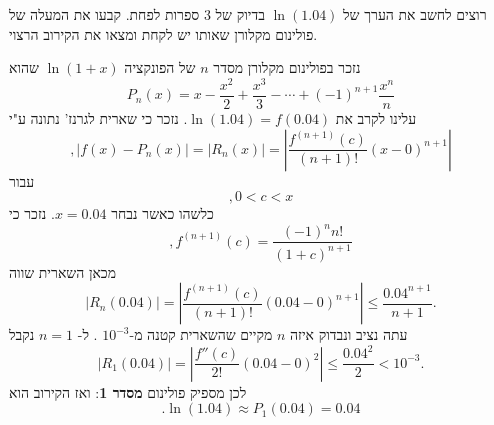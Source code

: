 רוצים לחשב את הערך של
\(\ln (1.04)\) בדיוק של 3 ספרות לפחת. קבעו את המעלה של פולינום מקלורן שאותו יש לקחת
ומצאו את הקירוב הרצוי.
\begin{solbox}
נזכר בפולינום מקלורן מסדר
$n$
של הפונקציה
$\ln(1+x)$
שהוא
\[
P_n(x)= x-\frac{x^2}{2}+\frac{x^3}{3}-\cdots+(-1)^{n+1}\frac{x^n}{n}
\]
עלינו לקרב את
$\ln(1.04)=f(0.04)$.
נזכר כי שארית לגרנז' נתונה ע"י
$$,|f(x)-P_n(x)|=|R_n(x)|=\left|\frac{f^{(n+1)}(c)}{(n+1)!}(x-0)^{n+1}\right|$$
עבור
$$,0<c<x$$
כלשהו כאשר נבחר
$x=0.04$.
נזכר כי
$$,f^{(n+1)}(c)=\frac{(-1)^nn!}{(1+c)^{n+1}}$$
מכאן
השארית שווה
\[
|R_n(0.04)|=\left|\frac{f^{(n+1)}(c)}{(n+1)!}(0.04-0)^{n+1}\right|\le \frac{0.04^{n+1}}{n+1}.
\]
עתה נציב ונבדוק איזה
$n$
מקיים שהשארית קטנה מ-$10^{-3}$
. ל-
$n=1$
נקבל
\[
|R_1(0.04)|=\left|\frac{f''(c)}{2!}(0.04-0)^2\right|\le \frac{0.04^{2}}{2}<10^{-3}.
\]
לכן מספיק פולינום \textbf{מסדר 1}:
ואז הקירוב הוא
\[
.\ln(1.04)\approx
P_1(0.04)=
0.04
\]
\end{solbox}
